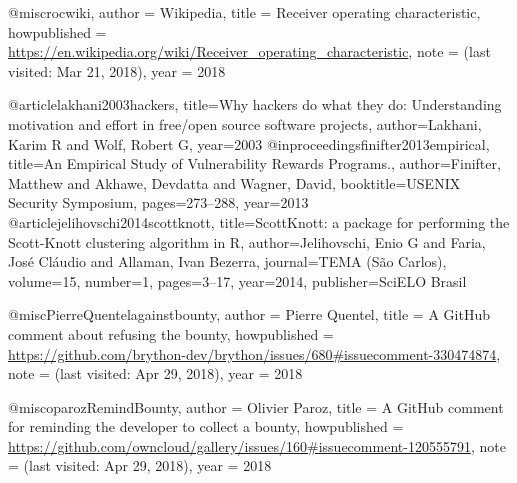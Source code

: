 @misc{rocwiki,
  author = {{Wikipedia}},
  title = {{Receiver operating characteristic}},
  howpublished = {\url{https://en.wikipedia.org/wiki/Receiver_operating_characteristic}},
  note = {(last visited: Mar 21, 2018)},
  year = {2018}
}

@article{lakhani2003hackers,
  title={Why hackers do what they do: Understanding motivation and effort in free/open source software projects},
  author={Lakhani, Karim R and Wolf, Robert G},
  year={2003}
}
@inproceedings{finifter2013empirical,
  title={An Empirical Study of Vulnerability Rewards Programs.},
  author={Finifter, Matthew and Akhawe, Devdatta and Wagner, David},
  booktitle={USENIX Security Symposium},
  pages={273--288},
  year={2013}
}
@article{jelihovschi2014scottknott,
  title={ScottKnott: a package for performing the Scott-Knott clustering algorithm in R},
  author={Jelihovschi, Enio G and Faria, Jos{\'e} Cl{\'a}udio and Allaman, Ivan Bezerra},
  journal={TEMA (S{\~a}o Carlos)},
  volume={15},
  number={1},
  pages={3--17},
  year={2014},
  publisher={SciELO Brasil}
}


@misc{PierreQuentelagainstbounty,
  author = {{Pierre Quentel}},
  title = {{A GitHub comment about refusing the bounty}},
  howpublished = {\url{https://github.com/brython-dev/brython/issues/680\#issuecomment-330474874}},
  note = {(last visited: Apr 29, 2018)},
  year = {2018}
}

@misc{oparozRemindBounty,
  author = {{Olivier Paroz}},
  title = {{A GitHub comment for reminding the developer to collect a bounty}},
  howpublished = {\url{https://github.com/owncloud/gallery/issues/160\#issuecomment-120555791}},
  note = {(last visited: Apr 29, 2018)},
  year = {2018}
}

